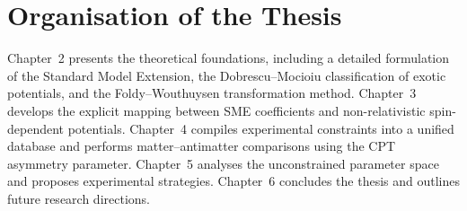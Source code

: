 \documentclass[main]{subfiles}
\begin{document}
\section{Organisation of the Thesis}

Chapter~2 presents the theoretical foundations, including a detailed
formulation of the Standard Model Extension, the Dobrescu--Mocioiu
classification of exotic potentials, and the Foldy--Wouthuysen transformation
method. Chapter~3 develops the explicit mapping between SME coefficients and
non-relativistic spin-dependent potentials. Chapter~4 compiles experimental
constraints into a unified database and performs matter--antimatter comparisons
using the CPT asymmetry parameter. Chapter~5 analyses the unconstrained
parameter space and proposes experimental strategies. Chapter~6 concludes the
thesis and outlines future research directions.
\end{document}
